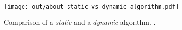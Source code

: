 \begin{figure}[hbtp]
  \centering  %
  \texttt{[image: out/about-static-vs-dynamic-algorithm.pdf]}
  \caption{Comparison of a \emph{static} and a \emph{dynamic} algorithm. \cite{incr-ramalingam96}.}
  \label{fig:about-static-vs-dynamic-algorithm}
\end{figure}
